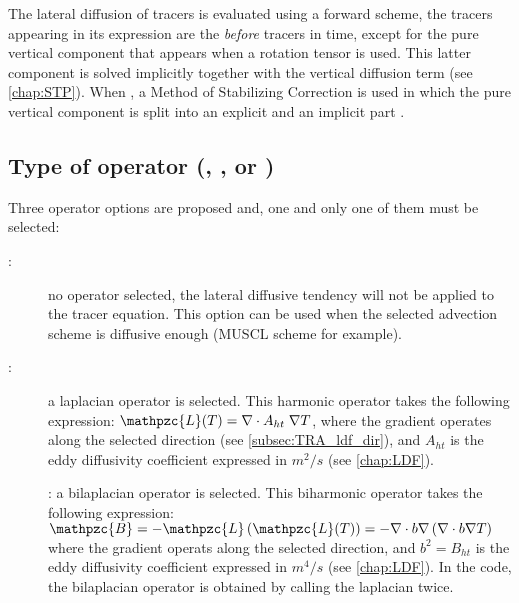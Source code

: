\documentclass[../main/NEMO_manual]{subfiles}
\begin{document}
The lateral diffusion of tracers is evaluated using a forward scheme,
\ie the tracers appearing in its expression are the \textit{before} tracers in time,
except for the pure vertical component that appears when a rotation tensor is used.
This latter component is solved implicitly together with the vertical diffusion term (see \autoref{chap:STP}).
When , a Method of Stabilizing Correction is used in which
the pure vertical component is split into an explicit and an implicit part \citep{Lemarie_OM2012}.

\subsection[Type of operator (\protect\np{ln\_traldf}\{\_NONE,\_lap,\_blp\}\})]
			     {Type of operator (\protect{}, \protect{}, or \protect{}) } 
\label{subsec:TRA_ldf_op}

Three operator options are proposed and, one and only one of them must be selected:
\begin{description}
\item[:]
  no operator selected, the lateral diffusive tendency will not be applied to the tracer equation.
  This option can be used when the selected advection scheme is diffusive enough (MUSCL scheme for example).
\item[:]
  a laplacian operator is selected.
  This harmonic operator takes the following expression:  $\mathpzc{L}(T)=\nabla \cdot A_{ht}\;\nabla T $,
  where the gradient operates along the selected direction (see \autoref{subsec:TRA_ldf_dir}),
  and $A_{ht}$ is the eddy diffusivity coefficient expressed in $m^2/s$ (see \autoref{chap:LDF}).
\item[]:
  a bilaplacian operator is selected.
  This biharmonic operator takes the following expression:
  $\mathpzc{B}=- \mathpzc{L}\left(\mathpzc{L}(T) \right) = -\nabla \cdot b\nabla \left( {\nabla \cdot b\nabla T} \right)$
  where the gradient operats along the selected direction,
  and $b^2=B_{ht}$ is the eddy diffusivity coefficient expressed in $m^4/s$  (see \autoref{chap:LDF}).
  In the code, the bilaplacian operator is obtained by calling the laplacian twice.
\end{description}
\end{document}
